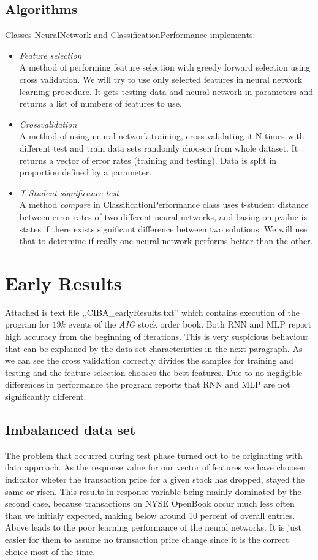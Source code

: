 \documentclass[twoside]{article}
\begin{document}
\begin{multicols}{2}
\subsection{Algorithms}
Classes NeuralNetwork and ClassificationPerformance implements:
\begin{itemize} 
\item \emph{Feature selection} \\
A method of performing feature selection with greedy forward selection using cross validation. 
We will try to use only selected features in neural network learning procedure. It gets testing data and neural network in parameters and returns a list of numbers of features to use.
\item \emph{Crossvalidation} \\
A method of using neural network training, cross validating it N times with different test and train data sets randomly choosen from whole dataset. It returns a vector of error rates (training and testing). 
Data is split in proportion defined by a parameter.
\item \emph{T-Student significance test} \\
A method \emph{compare} in ClassificationPerformance class uses t-student distance between error rates
of two different neural networks, and basing on pvalue is states if there exists significant difference 
between two solutions. We will use that to determine if really one neural network performs better than 
the other.
\end{itemize}

\section{Early Results}
Attached is text file ,,CIBA\_earlyResults.txt'' which contains execution of the program for $19k$ events of the \emph{AIG} stock order book.
Both RNN and MLP report high accuracy from the beginning of iterations. This is very suspicious behaviour that can be explained by the data set characteristics in the next paragraph. As we can see the cross validation correctly divides the samples for training and testing and the feature selection chooses the best features. Due to no negligible differences in performance the program reports that RNN and MLP are not significantly different.

\subsection{Imbalanced data set}
The problem that occurred during test phase turned out to be originating with data approach.
As the response value for our vector of features we have choosen indicator wheter the transaction price for a given stock has dropped, stayed the same or risen. This results in response variable being mainly dominated by the second case, because transactions on NYSE OpenBook occur much less often than we initialy expected, making below around 10 percent of overall entries.
Above leads to the poor learning performance of the neural networks. It is just easier for them to assume no transaction price change since it is the correct choice most of the time.


\end{multicols}
\end{document}
